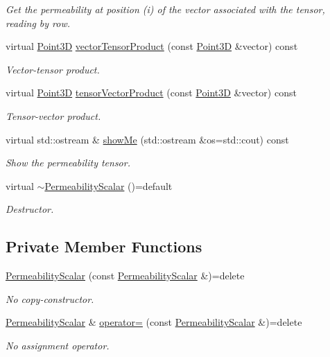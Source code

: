 \begin{DoxyCompactItemize}
\begin{DoxyCompactList}\small\item\em Get the permeability at position (i) of the vector associated with the tensor, reading by row. \end{DoxyCompactList}\item 
virtual \hyperlink{classFVCode3D_1_1Point3D}{Point3D} \hyperlink{classFVCode3D_1_1PermeabilityScalar_a43773753c437729c9b32a215449e1504}{vector\+Tensor\+Product} (const \hyperlink{classFVCode3D_1_1Point3D}{Point3D} \&vector) const 
\begin{DoxyCompactList}\small\item\em Vector-\/tensor product. \end{DoxyCompactList}\item 
virtual \hyperlink{classFVCode3D_1_1Point3D}{Point3D} \hyperlink{classFVCode3D_1_1PermeabilityScalar_a44a3c074a9485b6830470f50da3bedc2}{tensor\+Vector\+Product} (const \hyperlink{classFVCode3D_1_1Point3D}{Point3D} \&vector) const 
\begin{DoxyCompactList}\small\item\em Tensor-\/vector product. \end{DoxyCompactList}\item 
virtual std\+::ostream \& \hyperlink{classFVCode3D_1_1PermeabilityScalar_a9cb41282bbadb37a93a6a45a7120c04e}{show\+Me} (std\+::ostream \&os=std\+::cout) const 
\begin{DoxyCompactList}\small\item\em Show the permeability tensor. \end{DoxyCompactList}\item 
virtual \hyperlink{classFVCode3D_1_1PermeabilityScalar_a227818e681f09fdf4c3f8e5f6ea5eafe}{$\sim$\+Permeability\+Scalar} ()=default
\begin{DoxyCompactList}\small\item\em Destructor. \end{DoxyCompactList}\end{DoxyCompactItemize}
\subsection*{Private Member Functions}
\begin{DoxyCompactItemize}
\item 
\hyperlink{classFVCode3D_1_1PermeabilityScalar_a72ef0e5f3c24bde2db24d4b179ca42e8}{Permeability\+Scalar} (const \hyperlink{classFVCode3D_1_1PermeabilityScalar}{Permeability\+Scalar} \&)=delete
\begin{DoxyCompactList}\small\item\em No copy-\/constructor. \end{DoxyCompactList}\item 
\hyperlink{classFVCode3D_1_1PermeabilityScalar}{Permeability\+Scalar} \& \hyperlink{classFVCode3D_1_1PermeabilityScalar_a6a398b01eeb1ef899d5e181636984cd6}{operator=} (const \hyperlink{classFVCode3D_1_1PermeabilityScalar}{Permeability\+Scalar} \&)=delete
\begin{DoxyCompactList}\small\item\em No assignment operator. \end{DoxyCompactList}\end{DoxyCompactItemize}
